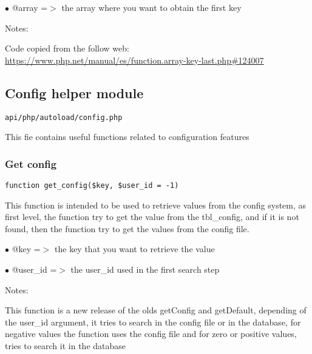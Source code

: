 \documentclass[a4paper]{article}
\def\htmladdnormallink#1#2{\href{#2}{#1}}
\begin{document}
\begin{compactitem}
\item[\color{myblue}$\bullet$] @array =$>$ the array where you want to obtain the first key
\end{compactitem}

Notes:

Code copied from the follow web:
\htmladdnormallink{https://www.php.net/manual/es/function.array-key-last.php\#124007}{https://www.php.net/manual/es/function.array-key-last.php\#124007}

\hypertarget{toc77}{}
\subsection{Config helper module}

\begin{lstlisting}
api/php/autoload/config.php
\end{lstlisting}

This fie contains useful functions related to configuration features

\hypertarget{toc78}{}
\subsubsection{Get config}

\begin{lstlisting}
function get_config($key, $user_id = -1)
\end{lstlisting}

This function is intended to be used to retrieve values from the config
system, as first level, the function try to get the value from the
tbl\_config, and if it is not found, then the function try to get the
values from the config file.

\begin{compactitem}
\item[\color{myblue}$\bullet$] @key     =$>$ the key that you want to retrieve the value
\item[\color{myblue}$\bullet$] @user\_id =$>$ the user\_id used in the first search step
\end{compactitem}

Notes:

This function is a new release of the olds getConfig and getDefault,
depending of the user\_id argument, it tries to search in the config file or
in the database, for negative values the function uses the config file and
for zero or positive values, tries to search it in the database
\end{document}
